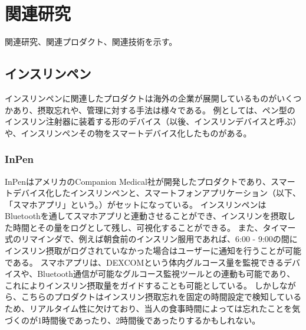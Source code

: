 \chapter{関連研究}
\label{chap:related_works}

関連研究、関連プロダクト、関連技術を示す。

\section{インスリンペン}

インスリンペンに関連したプロダクトは海外の企業が展開しているものがいくつかあり、摂取忘れや、管理に対する手法は様々である。
例としては、ペン型のインスリン注射器に装着する形のデバイス（以後、インスリンデバイスと呼ぶ）や、インスリンペンその物をスマートデバイス化したものがある。

\subsection{InPen}

InPenはアメリカのCompanion Medical社が開発したプロダクトであり、スマートデバイス化したインスリンペンと、スマートフォンアプリケーション（以下、「スマホアプリ」という。）がセットになっている。
インスリンペンはBluetoothを通してスマホアプリと連動させることができ、インスリンを摂取した時間とその量をログとして残し、可視化することができる。
また、タイマー式のリマインダで、例えば朝食前のインスリン服用であれば、6:00 - 9:00の間にインスリン摂取がログされていなかった場合はユーザーに通知を行うことが可能である。
スマホアプリは、DEXCOMという体内グルコース量を監視できるデバイスや、Bluetooth通信が可能なグルコース監視ツールとの連動も可能であり、これによりインスリン摂取量をガイドすることも可能としている。
しかしながら、こちらのプロダクトはインスリン摂取忘れを固定の時間設定で検知しているため、リアルタイム性に欠けており、当人の食事時間によっては忘れたことを気づくのが1時間後であったり、2時間後であったりするかもしれない。

